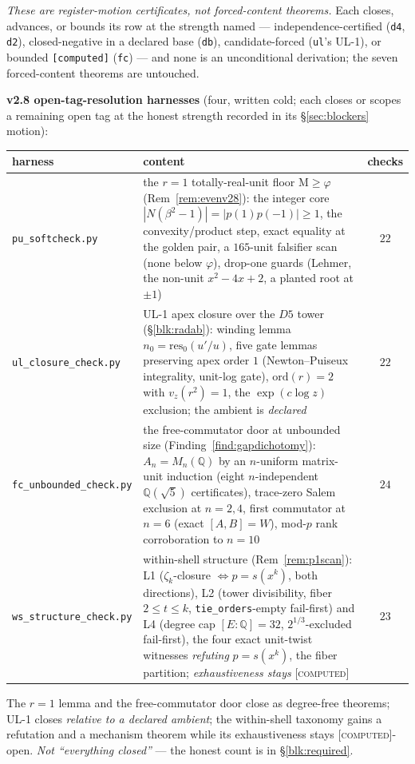 \documentclass[11pt]{article}
\newcommand{\tagC}{\textcolor{cC}{\textsc{[computed]}}}
\newcommand{\Q}{\mathbb{Q}}
\newcommand{\gp}{\varphi}
\newcommand{\M}{\mathrm{M}}
\theoremstyle{plain}
\theoremstyle{definition}
\theoremstyle{remark}
\begin{document}
\emph{These are register-motion certificates, not forced-content theorems.} Each
closes, advances, or bounds its row at the strength named --- independence-certified
(\texttt{d4}, \texttt{d2}), closed-negative in a declared base (\texttt{db}),
candidate-forced (\texttt{ul}'s \textsc{UL-1}), or bounded \texttt{[computed]}
(\texttt{fc}) --- and none is an unconditional derivation; the seven forced-content
theorems are untouched.

\smallskip\noindent
\textbf{v2.8 open-tag-resolution harnesses} (four, written cold; each closes or scopes
a remaining open tag at the honest strength recorded in its \S\ref{sec:blockers}
motion):
\begin{center}\footnotesize\setlength{\tabcolsep}{4pt}
\begin{tabular}{@{}lp{10.0cm}c@{}}
\toprule
harness & content & checks\\
\midrule
\texttt{pu\_softcheck.py} & the $r=1$ totally-real-unit floor $\M\ge\gp$ (Rem~\ref{rem:evenv28}): the integer core $|N(\beta^2-1)|=|p(1)p(-1)|\ge1$, the convexity/product step, exact equality at the golden pair, a $165$-unit falsifier scan (none below $\gp$), drop-one guards (Lehmer, the non-unit $x^2-4x+2$, a planted root at $\pm1$) & $22$\\
\texttt{ul\_closure\_check.py} & UL-1 apex closure over the $D5$ tower (\S\ref{blk:radab}): winding lemma $n_0{=}\mathrm{res}_0(u'/u)$, five gate lemmas preserving apex order $1$ (Newton--Puiseux integrality, unit-log gate), $\mathrm{ord}(r){=}2$ with $v_z(r^2){=}1$, the $\exp(c\log z)$ exclusion; the ambient is \emph{declared} & $22$\\
\texttt{fc\_unbounded\_check.py} & the free-commutator door at unbounded size (Finding~\ref{find:gapdichotomy}): $A_n{=}M_n(\Q)$ by an $n$-uniform matrix-unit induction (eight $n$-independent $\Q(\sqrt5)$ certificates), trace-zero Salem exclusion at $n{=}2,4$, first commutator at $n{=}6$ (exact $[A,B]{=}W$), mod-$p$ rank corroboration to $n{=}10$ & $24$\\
\texttt{ws\_structure\_check.py} & within-shell structure (Rem~\ref{rem:p1scan}): L1 ($\zeta_k$-closure $\iff p{=}s(x^k)$, both directions), L2 (tower divisibility, fiber $2\le t\le k$, \texttt{tie\_orders}-empty fail-first) and L4 (degree cap $[E:\Q]{=}32$, $2^{1/3}$-excluded fail-first), the four exact unit-twist witnesses \emph{refuting} $p{=}s(x^k)$, the fiber partition; \emph{exhaustiveness stays} \tagC{} & $23$\\
\bottomrule
\end{tabular}
\end{center}
The $r=1$ lemma and the free-commutator door close as degree-free theorems; UL-1
closes \emph{relative to a declared ambient}; the within-shell taxonomy gains a
refutation and a mechanism theorem while its exhaustiveness stays \tagC{}-open. \emph{Not
``everything closed''} --- the honest count is in \S\ref{blk:required}.
\end{document}
